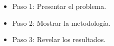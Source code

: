 \documentclass{beamer}
\begin{document}
\begin{frame}
\begin{itemize}
    \item Paso 1: Presentar el problema.
    \pause
    \item Paso 2: Mostrar la metodología.
    \pause
    \item Paso 3: Revelar los resultados.
\end{itemize}
\end{frame}
\end{document}

